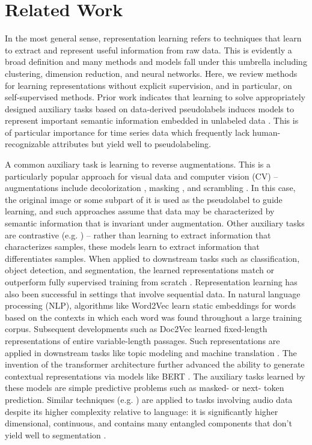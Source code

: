 \documentclass{article}
\begin{document}

\section{Related Work}
\label{sec:rw}

In the most general sense, representation learning refers to techniques that learn to extract and represent useful information from raw data. This is evidently a broad definition and many methods and models fall under this umbrella including clustering, dimension reduction, and neural networks. Here, we review methods for learning representations without explicit supervision, and in particular, on self-supervised methods. Prior work indicates that learning to solve appropriately designed auxiliary tasks based on data-derived pseudolabels induces models to represent important semantic information embedded in unlabeled data \cite{bengio13-rlsurvey, jing21-visualrl, mohamed22-speechrl}. This is of particular importance for time series data which frequently lack human-recognizable attributes but yield well to pseudolabeling.

A common auxiliary task is learning to reverse augmentations. This is a particularly popular approach for visual data and computer vision (CV) -- augmentations include decolorization \cite{zhang16-colorization}, masking \cite{pathak16-inpainting}, and scrambling \cite{noroozi17-puzzle}. In this case, the original image or some subpart of it is used as the pseudolabel to guide learning, and such approaches assume that data may be characterized by semantic information that is invariant under augmentation. Other auxiliary tasks are contrastive (e.g. \cite{vandenoord19-cpc, tian20-cmc}) -- rather than learning to extract information that characterizes samples, these models learn to extract information that differentiates samples. When applied to downstream tasks such as classification, object detection, and segmentation, the learned representations match or outperform fully supervised training from scratch \cite{jing21-visualrl}. Representation learning has also been successful in settings that involve sequential data. In natural language processing (NLP), algorithms like Word2Vec \cite{mikolov13-word2vec} learn static embeddings for words based on the contexts in which each word was found throughout a large training corpus. Subsequent developments such as Doc2Vec \cite{le14-doc2vec} learned fixed-length representations of entire variable-length passages. Such representations are applied in downstream tasks like topic modeling \cite{angelov20-top2vec} and machine translation \cite{sutskever14-seq2seq}. The invention of the transformer architecture \cite{vaswani17-transformer} further advanced the ability to generate contextual representations via models like BERT \cite{devlin19-bert}. The auxiliary tasks learned by these models are simple predictive problems such as masked- or next- token prediction. Similar techniques (e.g. \cite{vandenoord17-vqvae, chung20-apc, baevski20-wav2vec}) are applied to tasks involving audio data despite its higher complexity relative to language: it is significantly higher dimensional, continuous, and contains many entangled components that don't yield well to segmentation \cite{mohamed22-speechrl}. 
\end{document}
